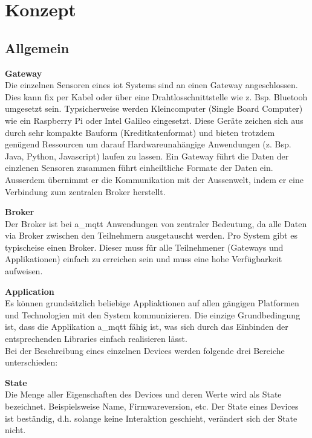 \chapter{Konzept}
\label{chap:konzept}


\section{Allgemein}

\textbf{Gateway} \\
Die einzelnen Sensoren eines \gls{iot} Systems sind an einen Gateway angeschlossen. Dies kann fix per Kabel oder über eine Drahtlosschnittstelle wie z. Bsp. Bluetooh umgesetzt sein. Typsicherweise werden Kleincomputer (Single Board Computer) wie ein Raspberry Pi oder Intel Galileo eingesetzt. Diese Geräte zeichen sich aus durch sehr kompakte Bauform (Kreditkatenformat) und bieten trotzdem genügend Ressourcen um darauf Hardwareunahängige Anwendungen (z. Bsp. Java, Python, Javascript) laufen zu lassen. 
Ein Gateway führt die Daten der einzlenen Sensoren zusammen führt einheiltliche Formate der Daten ein. Ausserdem übernimmt er die Kommunikation mit der Aussenwelt, indem er eine Verbindung zum zentralen Broker herstellt.

\textbf{Broker} \\
Der Broker ist bei \acrshort{a_mqtt} Anwendungen von zentraler Bedeutung, da alle Daten via Broker zwischen den Teilnehmern ausgetauscht werden. Pro System gibt es typischeise einen Broker. Dieser muss für alle Teilnehmener (Gateways und Applikationen) einfach zu erreichen sein und muss eine hohe Verfügbarkeit aufweisen.

\textbf{Application} \\
Es können grundsätzlich beliebige Appliaktionen auf allen gängigen Platformen und Technologien mit den System kommunizieren. Die einzige Grundbedingung ist, dass die Applikation \acrshort{a_mqtt} fähig ist, was sich durch das Einbinden der entsprechenden Libraries einfach realisieren lässt.
\\


Bei der Beschreibung eines einzelnen Devices werden folgende drei Bereiche unterschieden:

\textbf{State} \\
Die Menge aller Eigenschaften des Devices und deren Werte wird als State bezeichnet. Beispielsweise Name, Firmwareversion, etc. Der State eines Devices ist beständig, d.h. solange keine Interaktion geschieht, verändert sich der State nicht.


